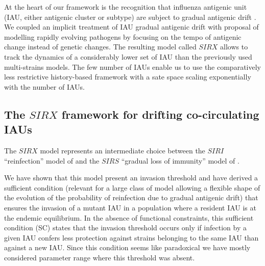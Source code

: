 At the heart of our framework is the recognition that influenza
antigenic unit (IAU, either antigenic cluster or subtype) are subject
to gradual antigenic drift \citep{Suzuki2008, Shih2007, Russell2008}.
We coupled an implicit treatment of IAU gradual antigenic drift with
\citet{Koelle2009} proposal of modelling rapidly evolving pathogens by
focusing on the tempo of antigenic change instead of genetic changes.
The resulting model called $SIRX$ allows to track the dynamics of a
considerably lower set of IAU than the previously used multi-strains
models. The few number of IAUs enable us to use the comparatively less
restrictive history-based framework with a sate space scaling
exponentially with the number of IAUs.




\subsection{The $SIRX$ framework for drifting co-circulating IAUs}


The $SIRX$ model represents an intermediate choice between the $SIRI$
``reinfection'' model of \citet{Goekaydin2007} and the $SIRS$
``gradual loss of immunity'' model of \citep{Pease1987}.

We have shown that this model present an invasion threshold and have
derived a sufficient condition (relevant for a large class of model
allowing a flexible shape of the evolution of the probability of
reinfection due to gradual antigenic drift) that ensures the invasion
of a mutant IAU in a population where a resident IAU is at the endemic
equilibrium. In the absence of functional constraints, this sufficient
condition (SC) states that the invasion threshold occurs only if
infection by a given IAU confers less protection against strains
belonging to the same IAU than against a new IAU. Since this condition
seems like paradoxical we have mostly considered parameter range where
this threshold was absent.

